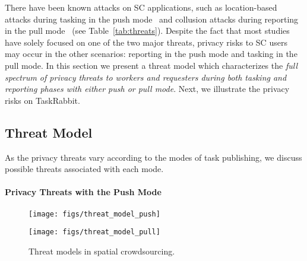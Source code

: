 \documentclass{USC-Thesis}
\numberwithin{equation}{chapter}
\begin{document}
There have been known attacks on SC applications, such as location-based attacks during tasking in the push mode~\cite{kazemi2011privacy} and collusion attacks during reporting in the pull mode~\cite{Wang2016} (see Table~\ref{tab:threats}). Despite the fact that most studies have solely focused on one of the two major threats, privacy risks to SC users may occur in the other scenarios: reporting in the push mode and tasking in the pull mode.
In this section we present a threat model which characterizes the \emph{full spectrum of privacy threats to workers and requesters during both tasking and reporting phases with either push or pull mode}. Next, we illustrate the privacy risks on TaskRabbit.

\subsection{Threat Model}
\label{sec:threat_model}
As the privacy threats vary according to the modes of task publishing, we discuss possible threats associated with each mode.

\paragraph{\textbf{Privacy Threats with the Push Mode}}

\begin{figure*}[ht]
	\begin{minipage}[b]{0.48\linewidth}
		\centering
		\texttt{[image: figs/threat\_model\_push]}
		\label{fig:threat_model_push}
	\end{minipage}
	\hspace{4pt}
	\begin{minipage}[b]{.48\linewidth}
		\centering
		\texttt{[image: figs/threat\_model\_pull]}
		\label{fig:threat_model_pull}
	\end{minipage}
	\caption{Threat models in spatial crowdsourcing.}
	\label{fig:threat_model}
\end{figure*}
\end{document}
